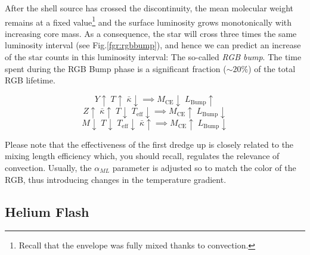 \par After the shell source has crossed the discontinuity, the mean molecular weight remains at a fixed value\footnote{Recall that the envelope was fully mixed thanks to convection.} and the surface luminosity grows monotonically with increasing core mass. As a consequence, the star will cross three times the same luminosity interval (see Fig.\ref{fgr:rgbbump}), and hence we can predict an increase of the star counts in this luminosity interval: The so-called \emph{RGB bump}. The time spent during the RGB Bump phase is a significant fraction ($\sim 20\%$) of the total RGB lifetime.

\begin{tcolorbox}[enhanced,attach boxed title to top center={yshift=-3mm,yshifttext=-1mm},
colback=blue!5!white,colframe=blue!75!black,colbacktitle=blue!80!black,
title=Various Dependences of the RGB Bump Luminosity,
boxed title style={size=small,colframe=blue!50!black}]
    $$ Y\uparrow\; T\uparrow\;\bar{\kappa}\downarrow\implies M_{\text{CE}}\downarrow\;L_{\text{Bump}}\uparrow$$ 
    $$ Z\uparrow\; \bar{\kappa}\uparrow\;T\downarrow\;T_{\text{eff}}\downarrow\implies M_{\text{CE}}\uparrow\;L_{\text{Bump}}\downarrow$$
    $$ M\downarrow\;T\downarrow\;T_{\text{eff}}\downarrow\;\bar{\kappa}\uparrow\implies M_{\text{CE}}\uparrow\;L_{\text{Bump}}\downarrow$$
\end{tcolorbox}

\par Please note that the effectiveness of the first dredge up is closely related to the mixing length efficiency which, you should recall, regulates the relevance of convection. Usually, the $\alpha_{ML}$ parameter is adjusted so to match the color of the RGB, thus introducing changes in the temperature gradient.

\subsection{Helium Flash}

